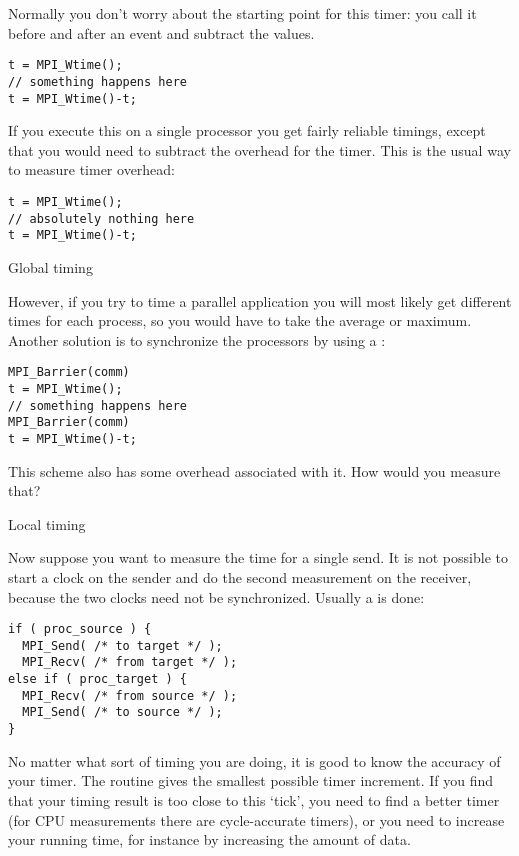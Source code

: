 Normally you don't worry about the starting point for this timer: 
you call it before and after an event and subtract the values.
\begin{lstlisting}
t = MPI_Wtime();
// something happens here
t = MPI_Wtime()-t;
\end{lstlisting}
If you execute this on a single processor you get fairly reliable
timings, except that you would need to subtract the overhead for the
timer. This is the usual way to measure timer overhead:
\begin{lstlisting}
t = MPI_Wtime();
// absolutely nothing here
t = MPI_Wtime()-t;
\end{lstlisting}

 {Global timing}

However, if you try to time a parallel application you will most likely
get different times for each process, so you would have to take the
average or maximum.  Another solution is to synchronize the processors
by using a :
\begin{lstlisting}
MPI_Barrier(comm)
t = MPI_Wtime();
// something happens here
MPI_Barrier(comm)
t = MPI_Wtime()-t;
\end{lstlisting}

\begin{exercise}
  This scheme also has some overhead associated with it. How would you measure that?
\end{exercise}

 {Local timing}
\label{sec:ping-time}

Now suppose you want to measure the time for a single send. It is not possible
to start a clock on the sender and do the second measurement on the receiver,
because the two clocks need not be synchronized. Usually a  is 
done: 
\begin{lstlisting}
if ( proc_source ) {
  MPI_Send( /* to target */ );
  MPI_Recv( /* from target */ );
else if ( proc_target ) {
  MPI_Recv( /* from source */ );
  MPI_Send( /* to source */ );
}
\end{lstlisting}

No matter what sort of timing you are doing, it is good to know the accuracy of your timer.
The routine  gives the smallest possible timer increment.
If you find that your timing result is too close to this `tick', you need to find a better timer
(for CPU measurements there are cycle-accurate timers), or you need to increase
your running time, for instance by increasing the amount of data.

